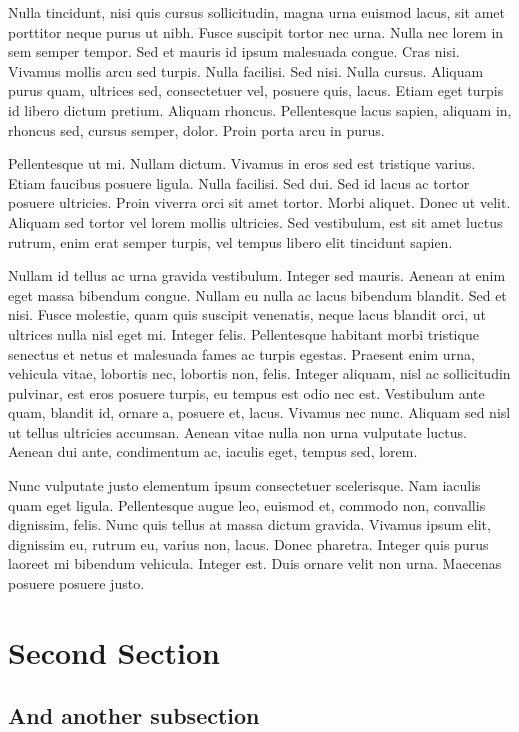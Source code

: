 \documentclass[journal]{vgtc}                %
\begin{document}
Nulla tincidunt, nisi quis cursus sollicitudin, magna urna euismod lacus, sit amet porttitor neque purus ut nibh. Fusce suscipit tortor nec urna. Nulla nec lorem in sem semper tempor. Sed et mauris id ipsum malesuada congue. Cras nisi. Vivamus mollis arcu sed turpis. Nulla facilisi. Sed nisi. Nulla cursus. Aliquam purus quam, ultrices sed, consectetuer vel, posuere quis, lacus. Etiam eget turpis id libero dictum pretium. Aliquam rhoncus. Pellentesque lacus sapien, aliquam in, rhoncus sed, cursus semper, dolor. Proin porta arcu in purus.

Pellentesque ut mi. Nullam dictum. Vivamus in eros sed est tristique varius. Etiam faucibus posuere ligula. Nulla facilisi. Sed dui. Sed id lacus ac tortor posuere ultricies. Proin viverra orci sit amet tortor. Morbi aliquet. Donec ut velit. Aliquam sed tortor vel lorem mollis ultricies. Sed vestibulum, est sit amet luctus rutrum, enim erat semper turpis, vel tempus libero elit tincidunt sapien.

Nullam id tellus ac urna gravida vestibulum. Integer sed mauris. Aenean at enim eget massa bibendum congue. Nullam eu nulla ac lacus bibendum blandit. Sed et nisi. Fusce molestie, quam quis suscipit venenatis, neque lacus blandit orci, ut ultrices nulla nisl eget mi. Integer felis. Pellentesque habitant morbi tristique senectus et netus et malesuada fames ac turpis egestas. Praesent enim urna, vehicula vitae, lobortis nec, lobortis non, felis. Integer aliquam, nisl ac sollicitudin pulvinar, est eros posuere turpis, eu tempus est odio nec est. Vestibulum ante quam, blandit id, ornare a, posuere et, lacus. Vivamus nec nunc. Aliquam sed nisl ut tellus ultricies accumsan. Aenean vitae nulla non urna vulputate luctus. Aenean dui ante, condimentum ac, iaculis eget, tempus sed, lorem.

Nunc vulputate justo elementum ipsum consectetuer scelerisque. Nam iaculis quam eget ligula. Pellentesque augue leo, euismod et, commodo non, convallis dignissim, felis. Nunc quis tellus at massa dictum gravida. Vivamus ipsum elit, dignissim eu, rutrum eu, varius non, lacus. Donec pharetra. Integer quis purus laoreet mi bibendum vehicula. Integer est. Duis ornare velit non urna. Maecenas posuere posuere justo. 

\section{Second Section}

\subsection{And another subsection}
\end{document}
